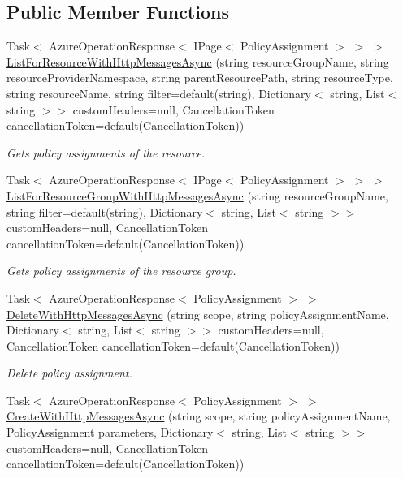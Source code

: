 \subsection*{Public Member Functions}
\begin{DoxyCompactItemize}
\item 
Task$<$ Azure\+Operation\+Response$<$ I\+Page$<$ Policy\+Assignment $>$ $>$ $>$ \hyperlink{interface_microsoft_1_1_azure_1_1_management_1_1_resources_1_1_i_policy_assignments_operations_abfa2953d666b6c6431f5149490a5b61b}{List\+For\+Resource\+With\+Http\+Messages\+Async} (string resource\+Group\+Name, string resource\+Provider\+Namespace, string parent\+Resource\+Path, string resource\+Type, string resource\+Name, string filter=default(string), Dictionary$<$ string, List$<$ string $>$$>$ custom\+Headers=null, Cancellation\+Token cancellation\+Token=default(Cancellation\+Token))
\begin{DoxyCompactList}\small\item\em Gets policy assignments of the resource. \end{DoxyCompactList}\item 
Task$<$ Azure\+Operation\+Response$<$ I\+Page$<$ Policy\+Assignment $>$ $>$ $>$ \hyperlink{interface_microsoft_1_1_azure_1_1_management_1_1_resources_1_1_i_policy_assignments_operations_aadbb2f57933c924e230de577c76f5dc6}{List\+For\+Resource\+Group\+With\+Http\+Messages\+Async} (string resource\+Group\+Name, string filter=default(string), Dictionary$<$ string, List$<$ string $>$$>$ custom\+Headers=null, Cancellation\+Token cancellation\+Token=default(Cancellation\+Token))
\begin{DoxyCompactList}\small\item\em Gets policy assignments of the resource group. \end{DoxyCompactList}\item 
Task$<$ Azure\+Operation\+Response$<$ Policy\+Assignment $>$ $>$ \hyperlink{interface_microsoft_1_1_azure_1_1_management_1_1_resources_1_1_i_policy_assignments_operations_ad5c6f66d1dd2ff82f6ac0ec939e20468}{Delete\+With\+Http\+Messages\+Async} (string scope, string policy\+Assignment\+Name, Dictionary$<$ string, List$<$ string $>$$>$ custom\+Headers=null, Cancellation\+Token cancellation\+Token=default(Cancellation\+Token))
\begin{DoxyCompactList}\small\item\em Delete policy assignment. \end{DoxyCompactList}\item 
Task$<$ Azure\+Operation\+Response$<$ Policy\+Assignment $>$ $>$ \hyperlink{interface_microsoft_1_1_azure_1_1_management_1_1_resources_1_1_i_policy_assignments_operations_a5db861822bbca067d42c7cf295dc8df9}{Create\+With\+Http\+Messages\+Async} (string scope, string policy\+Assignment\+Name, Policy\+Assignment parameters, Dictionary$<$ string, List$<$ string $>$$>$ custom\+Headers=null, Cancellation\+Token cancellation\+Token=default(Cancellation\+Token))

\end{DoxyCompactItemize}
